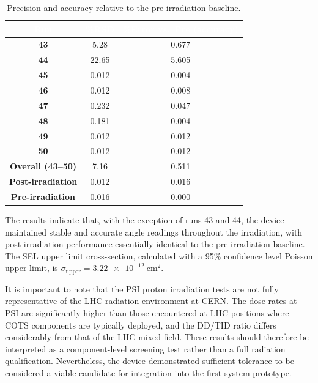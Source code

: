 \begin{table}[H]
    \centering
    \renewcommand{\arraystretch}{1.25}
    \setlength{\tabcolsep}{12pt}
    \begin{tabular}{>{\bfseries}c
                    S[table-format=2.3]
                    S[table-format=1.3]}
        \textcolor{white}{\textbf{Run}} &
        {\textcolor{white}{\textbf{\%RSD}}} &
        {\textcolor{white}{\textbf{\%Error vs.\ Pre (accuracy)}}} \\
        \hline
        43 & 5.28  & 0.677 \\
        44 & 22.65 & 5.605 \\
        45 & 0.012 & 0.004 \\
        46 & 0.012 & 0.008 \\
        47 & 0.232 & 0.047 \\
        48 & 0.181 & 0.004 \\
        49 & 0.012 & 0.012 \\
        50 & 0.012 & 0.012 \\
        \hline
        Overall (43--50) & 7.16  & 0.511 \\
        Post-irradiation & 0.012 & 0.016 \\
        Pre-irradiation  & 0.016 & 0.000 \\
        \hline
    \end{tabular}
    \caption{Precision and accuracy relative to the pre-irradiation baseline.}
    \label{tab:precision-accuracy-relative-pre-irradiation}
\end{table}

The results indicate that, with the exception of runs 43 and 44, the device maintained stable and accurate angle readings throughout the irradiation, with post-irradiation performance essentially identical to the pre-irradiation baseline. The SEL upper limit cross-section, calculated with a 95\% confidence level Poisson upper limit, is $\sigma_\text{upper} = \SI{3.22e-12}{\cm\squared}$.

It is important to note that the PSI proton irradiation tests are not fully representative of the LHC radiation environment at CERN. The dose rates at PSI are significantly higher than those encountered at LHC positions where COTS components are typically deployed, and the DD/TID ratio differs considerably from that of the LHC mixed field. These results should therefore be interpreted as a component-level screening test rather than a full radiation qualification. Nevertheless, the device demonstrated sufficient tolerance to be considered a viable candidate for integration into the first system prototype.

